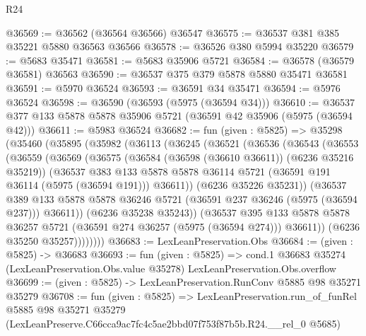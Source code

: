 \begin{lexlean}{R24}
\begin{coremodule}
@36569 := @36562 (@36564 @36566) @36547
@36575 := @36537 @381 @385 @35221 @5880 @36563 @36566
@36578 := @36526 @380 @5994 @35220
@36579 := @5683 @35471
@36581 := @5683 @35906 @5721
@36584 := @36578 (@36579 @36581) @36563
@36590 := @36537 @375 @379 @5878 @5880 @35471 @36581
@36591 := @5970 @36524
@36593 := @36591 @34 @35471
@36594 := @5976 @36524
@36598 := @36590 (@36593 (@5975 (@36594 @34)))
@36610 := @36537 @377 @133 @5878 @5878 @35906 @5721 (@36591 @42 @35906 (@5975 (@36594 @42)))
@36611 := @5983 @36524
@36682 := fun (given : @5825) =>
  @35298
    (@35460
      (@35895
        (@35982
          (@36113
            (@36245
              (@36521
                (@36536
                  (@36543
                    (@36553
                      (@36559
                        (@36569
                          (@36575
                            (@36584 (@36598 (@36610 @36611)) (@6236 @35216 @35219))
                            (@36537
                              @383
                              @133
                              @5878
                              @5878
                              @36114
                              @5721
                              (@36591 @191 @36114 (@5975 (@36594 @191)))
                              @36611))
                          (@6236 @35226 @35231))
                        (@36537
                          @389
                          @133
                          @5878
                          @5878
                          @36246
                          @5721
                          (@36591 @237 @36246 (@5975 (@36594 @237)))
                          @36611))
                      (@6236 @35238 @35243))
                    (@36537
                      @395
                      @133
                      @5878
                      @5878
                      @36257
                      @5721
                      (@36591 @274 @36257 (@5975 (@36594 @274)))
                      @36611))
                  (@6236 @35250 @35257))))))))
@36683 := LexLeanPreservation.Obs
@36684 := (given : @5825) -> @36683
@36693 := fun (given : @5825) =>
  cond.{1} @36683 @35274 (LexLeanPreservation.Obs.value @35278) LexLeanPreservation.Obs.overflow
@36699 := (given : @5825) -> LexLeanPreservation.RunConv @5885 @98 @35271 @35279
@36708 := fun (given : @5825) =>
  LexLeanPreservation.run_of_funRel
    @5885
    @98
    @35271
    @35279
    (LexLeanPreserve.C66cca9ac7fc4c5ae2bbd07f753f87b5b.R24.__rel_0 @5685)
\end{coremodule}
\end{lexlean}
